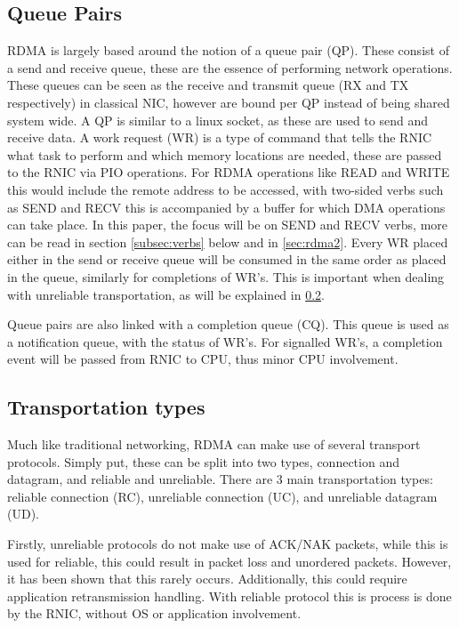 \subsection{Queue Pairs}\label{subsec:queue-pairs}
RDMA is largely based around the notion of a queue pair (QP).
These consist of a send and receive queue, these are the essence of performing network operations.
These queues can be seen as the receive and transmit queue (RX and TX respectively) in classical NIC, however are bound per QP instead of being shared system wide.
A QP is similar to a linux socket, as these are used to send and receive data.
A work request (WR) is a type of command that tells the RNIC what task to perform and which memory locations are needed, these are passed to the RNIC via PIO operations.
For RDMA operations like READ and WRITE this would include the remote address to be accessed, with two-sided verbs such as SEND and RECV this is accompanied by a buffer for which DMA operations can take place.
In this paper, the focus will be on SEND and RECV verbs, more can be read in section \ref{subsec:verbs} below and in \ref{sec:rdma2}.
Every WR placed either in the send or receive queue will be consumed in the same order as placed in the queue, similarly for completions of WR's.
This is important when dealing with unreliable transportation, as will be explained in \ref{subsec:transportation-types}.

Queue pairs are also linked with a completion queue (CQ).
This queue is used as a notification queue, with the status of WR's.
For signalled WR's, a completion event will be passed from RNIC to CPU, thus minor CPU involvement.

\subsection{Transportation types}\label{subsec:transportation-types}
Much like traditional networking, RDMA can make use of several transport protocols.
Simply put, these can be split into two types, connection and datagram, and reliable and unreliable.
There are 3 main transportation types: reliable connection (RC), unreliable connection (UC), and unreliable datagram (UD).

Firstly, unreliable protocols do not make use of ACK/NAK packets, while this is used for reliable, this could result in packet loss and unordered packets.
However, it has been shown that this rarely occurs\cite{kalia2014using, kalia2016fasst}.
Additionally, this could require application retransmission handling.
With reliable protocol this is process is done by the RNIC, without OS or application involvement.

